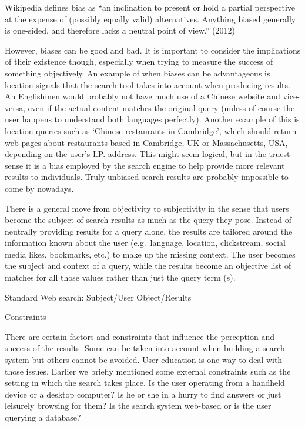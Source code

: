 Wikipedia defines bias as ``an inclination to present or hold a partial perspective at the expense of (possibly equally valid) alternatives. Anything biased generally is one-sided, and therefore lacks a neutral point of view.'' (2012)

However, biases can be good and bad. It is important to consider the implications of their existence though, especially when trying to measure the success of something objectively. An example of when biases can be advantageous is location signals that the search tool takes into account when producing results. An Englishmen would probably not have much use of a Chinese website and vice-versa, even if the actual content matches the original query (unless of course the user happens to understand both languages perfectly). Another example of this is location queries such as `Chinese restaurants in Cambridge', which should return web pages about restaurants based in Cambridge, UK or Massachusetts, USA, depending on the user’s I.P. address.  This might seem logical, but in the truest sense it is a bias employed by the search engine to help provide more relevant results to individuals. Truly unbiased search results are probably impossible to come by nowadays.

There is a general move from objectivity to subjectivity in the sense that users become the subject of search results as much as the query they pose. Instead of neutrally providing results for a query alone, the results are tailored around the information known about the user (e.g.\ language, location, clickstream, social media likes, bookmarks, etc.) to make up the missing context. The user becomes the subject and context of a query, while the results become an objective list of matches for all those values rather than just the query term (s).

Standard Web search:  Subject/User  Object/Results

Constraints

There are certain factors and constraints that influence the perception and success of the results. Some can be taken into account when building a search system but others cannot be avoided. User education is one way to deal with those issues. Earlier we briefly mentioned some external constraints such as the setting in which the search takes place. Is the user operating from a handheld device or a desktop computer? Is he or she in a hurry to find answers or just leisurely browsing for them? Is the search system web-based or is the user querying a database?

